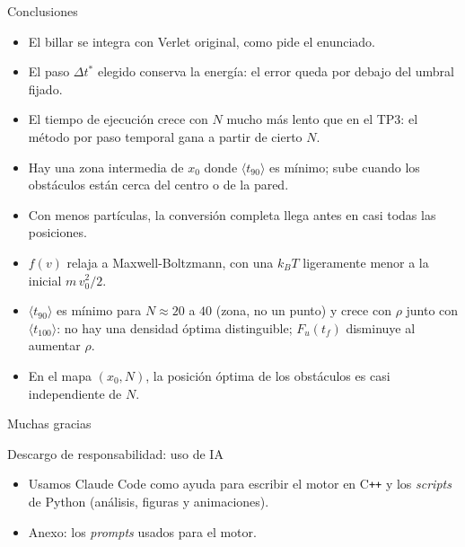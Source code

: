 \begin{frame}{Conclusiones}
  \footnotesize
  \begin{itemize}
    \item El billar se integra con Verlet original, como pide el enunciado.
    \vspace{0.15em}
    \item El paso $\Delta t^*$ elegido conserva la energía: el error queda por debajo del umbral fijado.
    \vspace{0.15em}
    \item El tiempo de ejecución crece con $N$ mucho más lento que en el TP3: el método por paso temporal gana a partir de cierto $N$.
    \vspace{0.15em}
    \item Hay una zona intermedia de $x_0$ donde $\langle t_{90} \rangle$ es mínimo; sube cuando los obstáculos están cerca del centro o de la pared.
    \vspace{0.15em}
    \item Con menos partículas, la conversión completa llega antes en casi todas las posiciones.
    \vspace{0.15em}
    \item $f(v)$ relaja a Maxwell-Boltzmann, con una $k_B T$ ligeramente menor a la inicial $m\,v_0^2/2$.
    \vspace{0.15em}
    \item $\langle t_{90} \rangle$ es mínimo para $N \approx 20$ a $40$ (zona, no un punto) y crece con $\rho$ junto con $\langle t_{100} \rangle$: no hay una densidad óptima distinguible; $F_u(t_f)$ disminuye al aumentar $\rho$.
    \vspace{0.15em}
    \item En el mapa $(x_0, N)$, la posición óptima de los obstáculos es casi independiente de $N$.
  \end{itemize}
\end{frame}

\begin{frame}[plain]
  \vfill
  \centering
  {\Huge Muchas gracias}
  \vfill
\end{frame}

\appendix

\begin{frame}{Descargo de responsabilidad: uso de IA}
  \begin{itemize}
    \item Usamos Claude Code como ayuda para escribir el motor en C\texttt{++} y los \emph{scripts} de Python (análisis, figuras y animaciones).
    \vspace{0.5em}
    \item Anexo: los \emph{prompts} usados para el motor.
  \end{itemize}
\end{frame}

